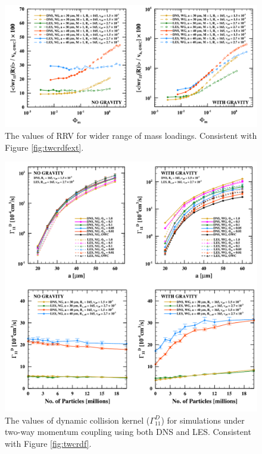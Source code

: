 
\begin{figure}
\centering
\includegraphics[width=13.5cm]{figures/2-11_twcrrvext.pdf}
\caption{
The values of RRV for wider range of mass loadings.
Consistent with Figure \ref{fig:twcrdfext}.
}
\label{fig:twcrrvext}
\end{figure}


\begin{figure}
\centering
\includegraphics[width=13.5cm]{figures/2-12_twcgamma.pdf}
\caption{
The values of dynamic collision kernel ($\Gamma_{11}^D$) for simulations under two-way momentum coupling using both DNS and LES.
Consistent with Figure \ref{fig:twcrdf}.
}
\label{fig:twcgamma}
\end{figure}


